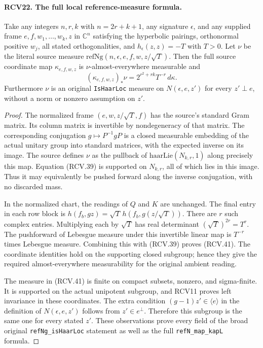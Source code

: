 \documentclass[11pt,a4paper]{article}
\numberwithin{equation}{section}
\theoremstyle{remark}\newtheorem{remark}[theorem]{Remark}
\begin{document}
\paragraph{RCV22. The full local reference-measure formula.}
\label{claim:RCV22}
Take any integers \(n,r,k\) with \(n=2r+k+1\), any signature
\(\epsilon\), and any supplied frame \(e,f,w_1,\ldots,w_k,z\)
in \(\mathbb C^n\) satisfying the hyperbolic pairings,
orthonormal positive \(w_j\), all stated orthogonalities, and
\(h_\epsilon(z,z)=-T\) with \(T>0\).
Let \(\nu\) be the literal source measure
\(\mathrm{refNg}(n,\epsilon,e,f,w,z/\sqrt T)\).
Then the full source coordinate map \(\kappa_{e,f,w,z}\) is
\(\nu\)-almost-everywhere measurable and
\[
       (\kappa_{e,f,w,z})_*\nu
                =2^{r^2+rk}T^{-r}\,d\kappa.
\tag{RCV.41}
\]
Furthermore \(\nu\) is an original \texttt{Is\allowbreak Haar\allowbreak Loc} measure
on \(N(\epsilon,e,z')\) for every \(z'\perp e\), without
a norm or nonzero assumption on \(z'\).
\begin{proof}
The normalized frame \((e,w,z/\sqrt T,f)\) has the source's
standard Gram matrix.  Its column matrix is invertible by
nondegeneracy of that matrix.  The corresponding conjugation
\(g\mapsto P^{-1}gP\) is a closed measurable embedding of the
actual unitary group into standard matrices, with the expected
inverse on its image.  The source defines \(\nu\) as the
pullback of \(\mathrm{haarLie}(N_{k,r},1)\) along precisely
this map.  Equation (RCV.39) is supported on \(N_{k,r}\), all
of which lies in this image.  Thus it may equivalently be pushed
forward along the inverse conjugation, with no discarded mass.

In the normalized chart, the readings of \(Q\) and \(K\)
are unchanged.  The final entry in each row block is
\(h(f_b,gz)=\sqrt T\,h(f_b,g(z/\sqrt T))\).
There are \(r\) such complex entries.  Multiplying each by
\(\sqrt T\) has real determinant \((\sqrt T)^{2r}=T^r\).
The pushforward of Lebesgue measure under this invertible linear
map is \(T^{-r}\) times Lebesgue measure.  Combining this
with (RCV.39) proves (RCV.41).  The coordinate identities hold
on the supporting closed subgroup; hence they give the required
almost-everywhere measurability for the original ambient reading.

The measure in (RCV.41) is finite on compact subsets, nonzero,
and sigma-finite.  It is supported on the actual unipotent subgroup,
and RCV11 proves left invariance in these coordinates.  The extra
condition \((g-1)z'\in\langle e\rangle\) in the definition of
\(N(\epsilon,e,z')\) follows from \(z'\in e^\perp\).
Therefore this subgroup is the same one for every stated \(z'\).
These observations prove every field of the broad original
\texttt{ref\allowbreak Ng\_\allowbreak is\allowbreak Haar\allowbreak Loc} statement as well as the full
\texttt{ref\allowbreak N\_\allowbreak map\_\allowbreak kap\allowbreak L} formula.
\end{proof}
\end{document}
